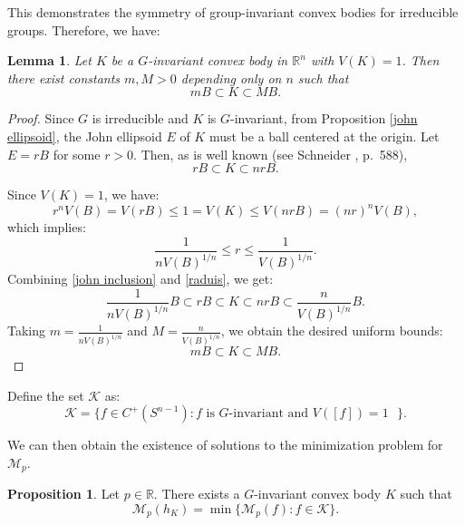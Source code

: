 \documentclass[12pt, reqno]{amsart}
\newtheorem{lemma}[theorem]{Lemma}
\theoremstyle{definition}
\newtheorem{proposition}[theorem]{Proposition}
\theoremstyle{remark}
\numberwithin{equation}{section}
\newcommand{\R}{\mathbb{R}}
\newcommand{\Sn}{S^{n-1}}
\begin{document}
This demonstrates the symmetry of group-invariant convex bodies for irreducible groups. Therefore, we have:



\begin{lemma}\label{uniM}
Let \(K\) be a \(G\)-invariant convex body in \(\mathbb{R}^n\) with  \(V(K) = 1\). Then there exist constants \(m, M > 0\) depending only on \(n\)
	such that
	\[
	mB 
	\subset K \subset
	MB.
	\]

	
\end{lemma}

\begin{proof}
	Since 
	\(G\) is irreducible and \(K\) is \(G\)-invariant, from Proposition \ref{john ellipsoid}, the John ellipsoid \(E\) of \(K\)  must be a ball centered at the origin. Let \(E = rB\) for some \(r > 0\). Then,
as is well known (see Schneider \cite{schneiderbook2014}, p.~588),
	\begin{equation}\label{john inclusion}
	rB 
	\subset K \subset
	nrB.
	\end{equation}
	
	 Since 
	\(V(K) = 1\), we have:
	\[
r^{n}V(B)=V(rB)\leq	1 = V(K) 
	\leq
	V(nrB) = (nr)^n V(B),
	\]
	which implies:
	\begin{equation}\label{raduis}
\frac{1}{n V(B)^{1/n}}\leq	r  	\leq \frac{1}{V(B)^{1/n}}.
	\end{equation}
	Combining \eqref{john inclusion} and \eqref{raduis}, we get:
	\[
	\frac{1}{n V(B)^{1/n}} B \subset rB \subset K \subset nrB \subset \frac
	{n}{V(B)^{1/n}} B.
	\]
	Taking 
	\(m = \frac{1}{n V(B)^{1/n}}\) and \(M = \frac{n}{V(B)^{1/n}}\), we obtain the desired uniform bounds:
	\[
	mB 
	\subset K \subset
	MB.
	\]
	
\end{proof}

Define the set $\mathcal{K}$ as:
\begin{equation}\label{L}
	\mathcal{K}=\{f\in C^{+}(\Sn): \text{$f$ is $G$-invariant and $V([f])=1$ }\}.
\end{equation}

We can then obtain the existence of solutions to the minimization problem for $\mathcal{M}_{p}$.

\begin{proposition}\label{min Mp}
	Let  $p\in\R$.	There exists a $G$-invariant convex body  $K$  such that 
	\begin{equation}
		\mathcal{M}_{p}(h_{K})=\min \{\mathcal{M}_{p}(f): f\in \mathcal{K}\}.
	\end{equation}
\end{proposition}
\end{document}
